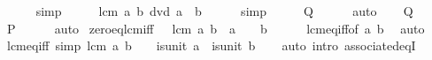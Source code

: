 \begin{isabellebody}
\ \ \ \ \isamarkupfalse%
\ simp\isanewline
\ \ \isamarkupfalse%
\ \isamarkupfalse%
\ {\isachardoublequoteopen}lcm\ a\ b\ dvd\ {\isacharparenleft}{\kern0pt}a\ {\isacharasterisk}{\kern0pt}\ b{\isacharparenright}{\kern0pt}{\isachardoublequoteclose}\isanewline
\ \ \ \ \isamarkupfalse%
\ simp\isanewline
\ \ \isamarkupfalse%
\ \isamarkupfalse%
\ {\isacharquery}{\kern0pt}Q\isanewline
\ \ \ \ \isamarkupfalse%
\ auto\isanewline
{}\isamarkupfalse%
\isanewline
\ \ \isamarkupfalse%
\ {\isacharquery}{\kern0pt}Q\isanewline
\ \ \isamarkupfalse%
\ \isamarkupfalse%
\ {\isacharquery}{\kern0pt}P\isanewline
\ \ \ \ \isamarkupfalse%
\ auto\isanewline
{}\isamarkupfalse%
%
\endisatagproof
{\isafoldproof}%
%
\isadelimproof
\isanewline
%
\endisadelimproof
\isanewline
{}\isamarkupfalse%
\ zero{\isacharunderscore}{\kern0pt}eq{\isacharunderscore}{\kern0pt}lcm{\isacharunderscore}{\kern0pt}iff{\isacharcolon}{\kern0pt}\ {\isachardoublequoteopen}{}\ {\isacharequal}{\kern0pt}\ lcm\ a\ b\ {\isasymlongleftrightarrow}\ a\ {\isacharequal}{\kern0pt}\ {}\ {\isasymor}\ b\ {\isacharequal}{\kern0pt}\ {}{\isachardoublequoteclose}\isanewline
%
\isadelimproof
\ \ %
\endisadelimproof
%
\isatagproof
{}\isamarkupfalse%
\ lcm{\isacharunderscore}{\kern0pt}eq{\isacharunderscore}{\kern0pt}{}{\isacharunderscore}{\kern0pt}iff{\isacharbrackleft}{\kern0pt}of\ a\ b{\isacharbrackright}{\kern0pt}\ \isamarkupfalse%
\ auto%
\endisatagproof
{\isafoldproof}%
%
\isadelimproof
\isanewline
%
\endisadelimproof
\isanewline
{}\isamarkupfalse%
\ lcm{\isacharunderscore}{\kern0pt}eq{\isacharunderscore}{\kern0pt}{}{\isacharunderscore}{\kern0pt}iff\ {\isacharbrackleft}{\kern0pt}simp{\isacharbrackright}{\kern0pt}{\isacharcolon}{\kern0pt}\ {\isachardoublequoteopen}lcm\ a\ b\ {\isacharequal}{\kern0pt}\ {}\ {\isasymlongleftrightarrow}\ is{\isacharunderscore}{\kern0pt}unit\ a\ {\isasymand}\ is{\isacharunderscore}{\kern0pt}unit\ b{\isachardoublequoteclose}\isanewline
%
\isadelimproof
\ \ %
\endisadelimproof
%
\isatagproof
{}\isamarkupfalse%
\ {\isacharparenleft}{\kern0pt}auto\ intro{\isacharcolon}{\kern0pt}\ associated{\isacharunderscore}{\kern0pt}eqI{\isacharparenright}{\kern0pt}%
\endisatagproof
{\isafoldproof}%
%
\isadelimproof
\isanewline
%
\endisadelimproof
\isanewline
{}\isamarkupfalse%

\end{isabellebody}
